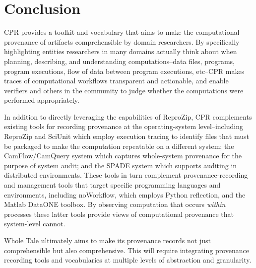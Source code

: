 \section{Conclusion}

CPR provides a toolkit and vocabulary that aims to make the computational provenance of artifacts comprehensible by domain researchers. By specifically highlighting entities researchers in many domains actually think about when planning, describing, and understanding computations--data files, programs, program executions, flow of data between program executions, etc--CPR makes traces of computational workflows transparent and actionable, and enable verifiers and others in the community to judge whether the computations were performed appropriately.

In addition to directly leveraging the capabilities of ReproZip, CPR complements existing tools for recording provenance at the operating-system level--including ReproZip and SciUnit which employ execution tracing to identify files that must be packaged to make the computation repeatable on a different system; the CamFlow/CamQuery system which captures whole-system provenance for the purpose of system audit; and the SPADE system which supports auditing in distributed environments. These tools in turn complement provenance-recording and management tools that target specific programming languages and environments, including noWorkflow, which employs Python reflection, and the Matlab DataONE toolbox. By observing computation that occurs \emph{within} processes these latter tools provide views of computational provenance that system-level cannot.

Whole Tale ultimately aims to make its provenance records not just comprehensible but also comprehensive. This will require integrating provenance recording tools and vocabularies at multiple levels of abstraction and granularity.

